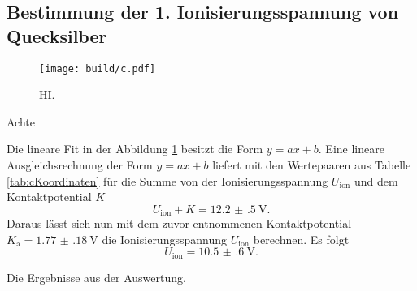 \subsection{Bestimmung der 1. Ionisierungsspannung von Quecksilber}
\begin{figure}
	\centering
	\caption{HI.}
	\texttt{[image: build/c.pdf]}
	\label{fig:c}
\end{figure}
\begin{table}
	\caption{Achte}
	\centering
	
\end{table}
Die lineare Fit in der Abbildung \ref{fig:c} besitzt die Form $y=a x + b$. Eine lineare Ausgleichsrechnung der Form $y=a x+b$ liefert mit den Wertepaaren aus Tabelle \ref{tab:cKoordinaten} für die Summe von der Ionisierungsspannung $U_\text{ion}$ und dem Kontaktpotential $K$
\begin{displaymath}
	U_\text{ion}+K=\SI{12.2(5)}{\volt}\text{.}
\end{displaymath}
Daraus lässt sich nun mit dem zuvor entnommenen Kontaktpotential $K_\text{a}=\SI{1.77(18)}{\volt}$ die Ionisierungsspannung $U_\text{ion}$ berechnen. Es folgt
\begin{displaymath}
U_\text{ion}=\SI{10.5(6)}{\volt}\text{.}
\end{displaymath}

\begin{table}
	\caption{Die Ergebnisse aus der Auswertung.}
	\centering
	
\end{table}


